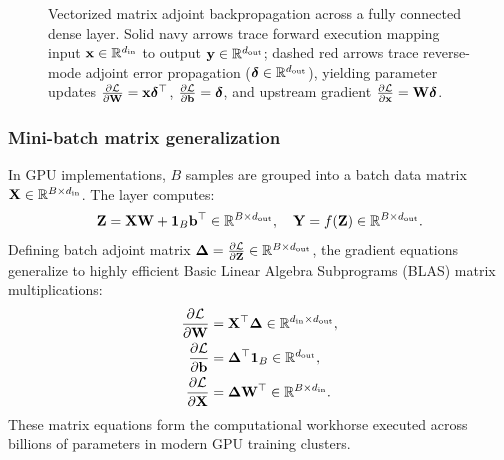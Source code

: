 \documentclass[../../main.tex]{subfiles}
\begin{document}
\begin{figure}[htbp]
\caption{Vectorized matrix adjoint backpropagation across a fully connected dense layer. Solid navy arrows trace forward execution mapping input $\mathbf{x} \in \mathbb{R}^{d_{\text{in}}}$ to output $\mathbf{y} \in \mathbb{R}^{d_{\text{out}}}$; dashed red arrows trace reverse-mode adjoint error propagation ($\bm{\delta} \in \mathbb{R}^{d_{\text{out}}}$), yielding parameter updates $\frac{\partial \mathcal{L}}{\partial \mathbf{W}} = \mathbf{x} \bm{\delta}^\top$, $\frac{\partial \mathcal{L}}{\partial \mathbf{b}} = \bm{\delta}$, and upstream gradient $\frac{\partial \mathcal{L}}{\partial \mathbf{x}} = \mathbf{W} \bm{\delta}$.}
\label{fig:vectorized_backprop_block}
\end{figure}

\subsubsection{Mini-batch matrix generalization}
In GPU implementations, $B$ samples are grouped into a batch data matrix $\mathbf{X} \in \mathbb{R}^{B \times d_{\text{in}}}$. The layer computes:
\begin{equation}
\mathbf{Z} = \mathbf{X} \mathbf{W} + \mathbf{1}_B \mathbf{b}^\top \in \mathbb{R}^{B \times d_{\text{out}}}, \quad \mathbf{Y} = f(\mathbf{Z}) \in \mathbb{R}^{B \times d_{\text{out}}}.
\end{equation}
Defining batch adjoint matrix $\bm{\Delta} = \frac{\partial \mathcal{L}}{\partial \mathbf{Z}} \in \mathbb{R}^{B \times d_{\text{out}}}$, the gradient equations generalize to highly efficient Basic Linear Algebra Subprograms (BLAS) matrix multiplications:
\begin{align}
\frac{\partial \mathcal{L}}{\partial \mathbf{W}} &= \mathbf{X}^\top \bm{\Delta} \in \mathbb{R}^{d_{\text{in}} \times d_{\text{out}}}, \label{eq:batch_grad_W} \\
\frac{\partial \mathcal{L}}{\partial \mathbf{b}} &= \bm{\Delta}^\top \mathbf{1}_B \in \mathbb{R}^{d_{\text{out}}}, \label{eq:batch_grad_b} \\
\frac{\partial \mathcal{L}}{\partial \mathbf{X}} &= \bm{\Delta} \mathbf{W}^\top \in \mathbb{R}^{B \times d_{\text{in}}}. \label{eq:batch_grad_X}
\end{align}
These matrix equations form the computational workhorse executed across billions of parameters in modern GPU training clusters.
\end{document}
